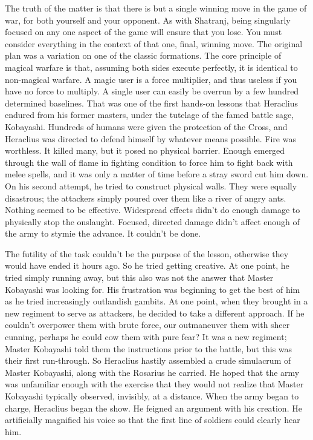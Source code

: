 The truth of the matter is that there is but a single winning move in the game of war, for both yourself and your opponent. As with Shatranj, being singularly focused on any one aspect of the game will ensure that you lose. You must consider everything in the context of that one, final, winning move.
\SmallVSpace
The original plan was a variation on one of the classic formations. The core principle of magical warfare is that, assuming both sides execute perfectly, it is identical to non-magical warfare. A magic user is a force multiplier, and thus useless if you have no force to multiply. A single user can easily be overrun by a few hundred determined baselines.
\SmallVSpace
That was one of the first hands-on lessons that Heraclius endured from his former masters, under the tutelage of the famed battle sage, Kobayashi. Hundreds of humans were given the protection of the Cross, and Heraclius was directed to defend himself by whatever means possible. Fire was worthless. It killed many, but it posed no physical barrier. Enough emerged through the wall of flame in fighting condition to force him to fight back with melee spells, and it was only a matter of time before a stray sword cut him down.
\SmallVSpace
On his second attempt, he tried to construct physical walls. They were equally disastrous; the attackers simply poured over them like a river of angry ants. Nothing seemed to be effective. Widespread effects didn’t do enough damage to physically stop the onslaught. Focused, directed damage didn’t affect enough of the army to stymie the advance. It couldn’t be done.

The futility of the task couldn’t be the purpose of the lesson, otherwise they would have ended it hours ago. So he tried getting creative. At one point, he tried simply running away, but this also was not the answer that Master Kobayashi was looking for. His frustration was beginning to get the best of him as he tried increasingly outlandish gambits.
\SmallVSpace
At one point, when they brought in a new regiment to serve as attackers, he decided to take a different approach. If he couldn’t overpower them with brute force, our outmaneuver them with sheer cunning, perhaps he could cow them with pure fear?
\SmallVSpace
It was a new regiment; Master Kobayashi told them the instructions prior to the battle, but this was their first run-through. So Heraclius hastily assembled a crude simulacrum of Master Kobayashi, along with the Rosarius he carried. He hoped that the army was unfamiliar enough with the exercise that they would not realize that Master Kobayashi typically observed, invisibly, at a distance.
\SmallVSpace
When the army began to charge, Heraclius began the show. He feigned an argument with his creation. He artificially magnified his voice so that the first line of soldiers could clearly hear him.

